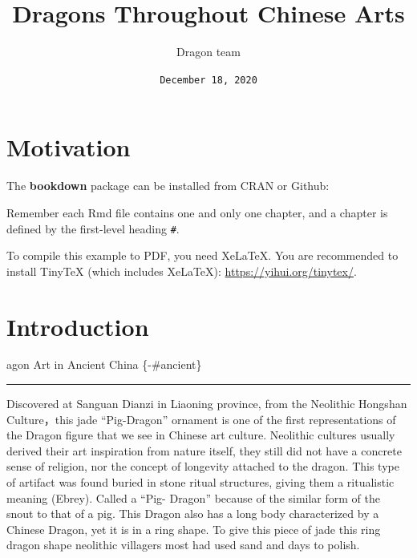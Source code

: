 \documentclass[
]{book}
\title{Dragons Throughout Chinese Arts}
\author{Dragon team}
\date{\texttt{December\ 18,\ 2020}}
\begin{document}
\maketitle

{
\setcounter{tocdepth}{1}
\tableofcontents
}
\hypertarget{motivation}{%
\chapter*{Motivation}\label{motivation}}

The \textbf{bookdown} package can be installed from CRAN or Github:

Remember each Rmd file contains one and only one chapter, and a chapter is defined by the first-level heading \texttt{\#}.

To compile this example to PDF, you need XeLaTeX. You are recommended to install TinyTeX (which includes XeLaTeX): \url{https://yihui.org/tinytex/}.

\hypertarget{intro}{%
\chapter*{Introduction}\label{intro}}

agon Art in Ancient China \{-\#ancient\}

\begin{center}\rule{0.5\linewidth}{0.5pt}\end{center}

Discovered at Sanguan Dianzi in Liaoning province, from the Neolithic Hongshan Culture，this jade ``Pig-Dragon'' ornament is one of the first representations of the Dragon figure that we see in Chinese art culture. Neolithic cultures usually derived their art inspiration from nature itself, they still did not have a concrete sense of religion, nor the concept of longevity attached to the dragon. This type of artifact was found buried in stone ritual structures, giving them a ritualistic meaning (Ebrey).
Called a ``Pig- Dragon'' because of the similar form of the snout to that of a pig. This Dragon also has a long body characterized by a Chinese Dragon, yet it is in a ring shape. To give this piece of jade this ring dragon shape neolithic villagers most had used sand and days to polish.
\end{document}
